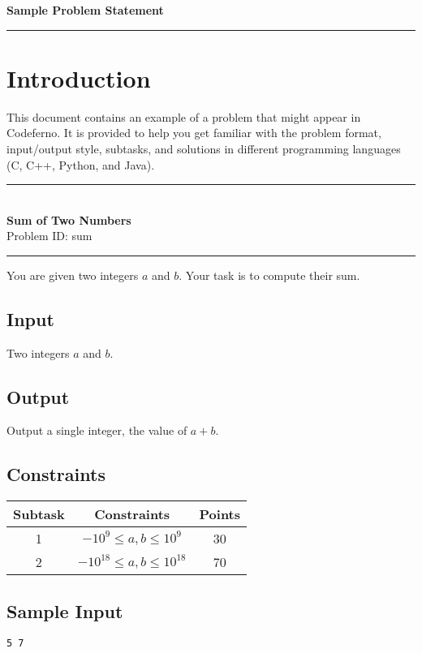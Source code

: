 \documentclass[12pt,a4paper]{article}
\newcommand{\problemtitle}[2]{%
  \begin{center}
    \rule{\textwidth}{0.4pt}\\[1.5em]
    {\LARGE \textbf{#1}} \\[0.5em]
    {Problem ID: #2} \\[0.5em]
    \rule{\textwidth}{0.4pt}
  \end{center}
}
\begin{document}
\ifdefined\BOOKLET
  \pagestyle{empty}
\fi

\begin{center}
    {\LARGE \textbf{Sample Problem Statement}} \\[0.5em]
    \rule{\textwidth}{0.4pt}
\end{center}

\vspace{1em}

\section*{Introduction}
This document contains an example of a problem that might appear in Codeferno.  
It is provided to help you get familiar with the problem format, input/output style, subtasks, and solutions in different programming languages (C, C++, Python, and Java).  

\problemtitle{Sum of Two Numbers}{sum}

You are given two integers $a$ and $b$. Your task is to compute their sum.

\subsection*{Input}
Two integers $a$ and $b$.

\subsection*{Output}
Output a single integer, the value of $a+b$.

\subsection*{Constraints}
\begin{tabular}{|c|c|c|}
\hline
\textbf{Subtask} & \textbf{Constraints} & \textbf{Points} \\
\hline
1 & $-10^9 \leq a, b \leq 10^9$ & 30 \\
\hline
2 & $-10^{18} \leq a, b \leq 10^{18}$ & 70 \\
\hline
\end{tabular}

\subsection*{Sample Input}
\begin{verbatim}
5 7
\end{verbatim}
\end{document}
